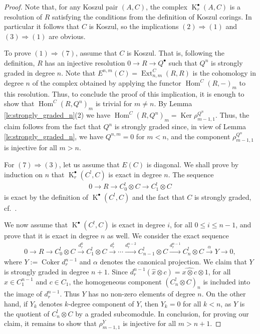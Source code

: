 \documentclass[pdftex]{sigma}
\DeclareMathOperator{\K}{K}
\newcommand\ot{\otimes}
\newcommand{\Coker}{\operatorname{Coker}}
\renewcommand{\^}[1]{\mbox{$^{\left( #1 \right)}$}}
\renewcommand{\_}[1]{\mbox{$_{\left( #1 \right)}$}}
\newcommand{\al}{\alpha}
\numberwithin{equation}{section}
\begin{document}
\begin{proof}
Note that, for any Koszul pair $(A,C)$, the complex $\K^\bullet_r(A,C)$ is a resolution of $R$ sa\-tisfying the conditions from the def\/inition of Koszul corings. In particular it follows that $C$ is Koszul, so the implications $(2) \Longrightarrow (1)$ and $(3) \Longrightarrow (1)$ are obvious.

To prove $(1) \Longrightarrow (7)$, assume that $C$ is Koszul. That is, following the def\/inition, $R$ has an injective resolution $0 \rightarrow R \rightarrow Q^\bullet$ such that $Q^n$ is strongly graded in degree $n$. Note that $E^{n,m}(C)=\operatorname{Ext}_{n,m}^C(R,R)$ is the cohomology in degree $n$ of the complex obtained by applying the functor $\operatorname{Hom}^C(R,-)_m$ to this resolution. Thus, to conclude the proof of this implication, it is enough to show that $\operatorname{Hom}^C(R,Q^n)_m$ is trivial for $m\neq n$. By Lemma \ref{le:strongly_graded_n}(2) we have $\operatorname{Hom}^C(R,Q^n)_m=\operatorname{Ker}\rho^{Q^n}_{m-1,1}$. Thus, the claim follows from the fact that $Q^n$ is strongly graded since, in view of Lemma \ref{le:strongly_graded_n}, we have $Q^{n,m}=0$ for $m<n$, and the component $\rho^{Q^n}_{m-1,1}$ is injective for all $m>n$.

For $(7) \Longrightarrow (3)$, let us assume that $E(C)$ is diagonal. We shall prove by induction on $n$ that $\K_r^\bullet(C^!,C) $ is exact in degree $n$. The sequence
\begin{gather*}
 0\longrightarrow R\longrightarrow C_0^!\ot C\longrightarrow
 C_1^!\ot C
\end{gather*}
is exact by the def\/inition of $\K^\bullet(C^!,C)$ and the fact that $C$ is strongly graded, cf.\ \cite[Lemma~2.1]{jps}.


We now assume that $\K^\bullet(C^!,C)$ is exact in degree $i$, for all $0\leq i\leq n-1$, and prove that it is exact in degree $n$ as well. We consider the exact sequence
\begin{gather}\label{eq:sequenceC!}
 0 \rightarrow R \rightarrow C^!_0\ot C \xrightarrow{d^0_r} C_1^! \otimes C \xrightarrow{d^1_r} \cdots \xrightarrow{d^{n-2}_r} C^!_{n-1}\ot C \xrightarrow{d^{n-1}_r} C_n^! \otimes C \xrightarrow{\al}Y \rightarrow 0,
\end{gather}
where $Y:=\Coker d^{n-1}_r$ and $\al$ denotes the canonical projection. We claim that $Y$ is strongly graded in degree $n+1$. Since $d_r^{n-1}(\widehat{x}\ot c)= \widehat{x\ot c}\ot 1$, for all $x\in C_1^{n-1}$ and $c\in C_1$, the homogeneous component $(C_n^!\ot C)_n$ is included into the image of $d_r^{n-1}$. Thus $Y$ has no non-zero elements of degree $n$. On the other hand, if $Y_k$ denotes $k$-degree component of $Y$, then $Y_k=0$ for all $k<n$, as $Y$ is the quotient of $C_n^!\ot C$ by a graded subcomodule. In conclusion, for proving our claim, it remains to show that $\rho^Y_{m-1,1}$ is injective for all $m>n+1$.


\end{proof}
\end{document}
